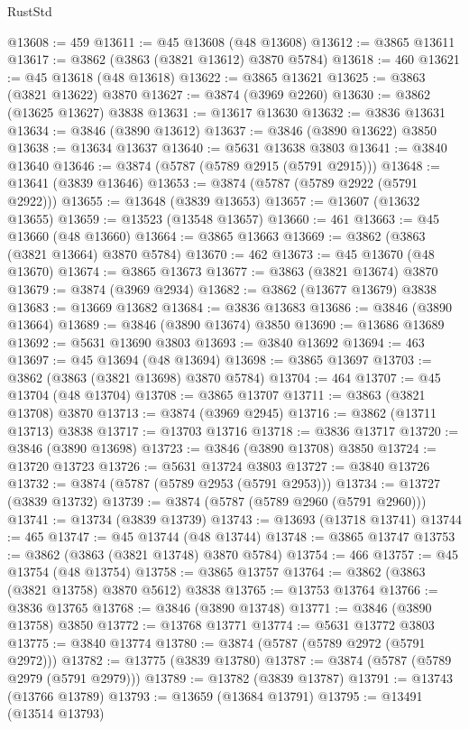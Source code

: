 \begin{lexlean}{RustStd}
\begin{coremodule}
@13608 := 459
@13611 := @45 @13608 (@48 @13608)
@13612 := @3865 @13611
@13617 := @3862 (@3863 (@3821 @13612) @3870 @5784)
@13618 := 460
@13621 := @45 @13618 (@48 @13618)
@13622 := @3865 @13621
@13625 := @3863 (@3821 @13622) @3870
@13627 := @3874 (@3969 @2260)
@13630 := @3862 (@13625 @13627) @3838
@13631 := @13617 @13630
@13632 := @3836 @13631
@13634 := @3846 (@3890 @13612)
@13637 := @3846 (@3890 @13622) @3850
@13638 := @13634 @13637
@13640 := @5631 @13638 @3803
@13641 := @3840 @13640
@13646 := @3874 (@5787 (@5789 @2915 (@5791 @2915)))
@13648 := @13641 (@3839 @13646)
@13653 := @3874 (@5787 (@5789 @2922 (@5791 @2922)))
@13655 := @13648 (@3839 @13653)
@13657 := @13607 (@13632 @13655)
@13659 := @13523 (@13548 @13657)
@13660 := 461
@13663 := @45 @13660 (@48 @13660)
@13664 := @3865 @13663
@13669 := @3862 (@3863 (@3821 @13664) @3870 @5784)
@13670 := 462
@13673 := @45 @13670 (@48 @13670)
@13674 := @3865 @13673
@13677 := @3863 (@3821 @13674) @3870
@13679 := @3874 (@3969 @2934)
@13682 := @3862 (@13677 @13679) @3838
@13683 := @13669 @13682
@13684 := @3836 @13683
@13686 := @3846 (@3890 @13664)
@13689 := @3846 (@3890 @13674) @3850
@13690 := @13686 @13689
@13692 := @5631 @13690 @3803
@13693 := @3840 @13692
@13694 := 463
@13697 := @45 @13694 (@48 @13694)
@13698 := @3865 @13697
@13703 := @3862 (@3863 (@3821 @13698) @3870 @5784)
@13704 := 464
@13707 := @45 @13704 (@48 @13704)
@13708 := @3865 @13707
@13711 := @3863 (@3821 @13708) @3870
@13713 := @3874 (@3969 @2945)
@13716 := @3862 (@13711 @13713) @3838
@13717 := @13703 @13716
@13718 := @3836 @13717
@13720 := @3846 (@3890 @13698)
@13723 := @3846 (@3890 @13708) @3850
@13724 := @13720 @13723
@13726 := @5631 @13724 @3803
@13727 := @3840 @13726
@13732 := @3874 (@5787 (@5789 @2953 (@5791 @2953)))
@13734 := @13727 (@3839 @13732)
@13739 := @3874 (@5787 (@5789 @2960 (@5791 @2960)))
@13741 := @13734 (@3839 @13739)
@13743 := @13693 (@13718 @13741)
@13744 := 465
@13747 := @45 @13744 (@48 @13744)
@13748 := @3865 @13747
@13753 := @3862 (@3863 (@3821 @13748) @3870 @5784)
@13754 := 466
@13757 := @45 @13754 (@48 @13754)
@13758 := @3865 @13757
@13764 := @3862 (@3863 (@3821 @13758) @3870 @5612) @3838
@13765 := @13753 @13764
@13766 := @3836 @13765
@13768 := @3846 (@3890 @13748)
@13771 := @3846 (@3890 @13758) @3850
@13772 := @13768 @13771
@13774 := @5631 @13772 @3803
@13775 := @3840 @13774
@13780 := @3874 (@5787 (@5789 @2972 (@5791 @2972)))
@13782 := @13775 (@3839 @13780)
@13787 := @3874 (@5787 (@5789 @2979 (@5791 @2979)))
@13789 := @13782 (@3839 @13787)
@13791 := @13743 (@13766 @13789)
@13793 := @13659 (@13684 @13791)
@13795 := @13491 (@13514 @13793)

\end{coremodule}
\end{lexlean}
